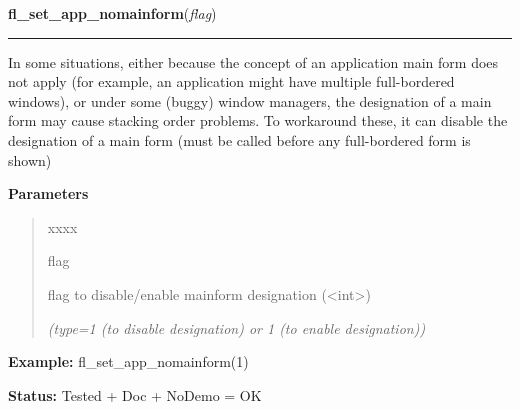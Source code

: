 \hspace{.8\funcindent}\begin{boxedminipage}{\funcwidth}

    \raggedright \textbf{fl\_set\_app\_nomainform}(\textit{flag})

    \vspace{-1.5ex}

    \rule{\textwidth}{0.5\fboxrule}
\setlength{\parskip}{2ex}
    In some situations, either because the concept of an application main 
    form does not apply (for example, an application might have multiple 
    full-bordered windows), or under some (buggy) window managers, the 
    designation of a main form may cause stacking order problems. To 
    workaround these, it can disable the designation of a main form (must 
    be called before any full-bordered form is shown)

\setlength{\parskip}{1ex}
      \textbf{Parameters}
      \vspace{-1ex}

      \begin{quote}
        \begin{Ventry}{xxxx}

          \item[flag]

          flag to disable/enable mainform designation 
          ({\textless}int{\textgreater})

            {\it (type=1 (to disable designation) or 1 (to enable designation))}

        \end{Ventry}

      \end{quote}

\textbf{Example:} fl\_set\_app\_nomainform(1)



\textbf{Status:} Tested + Doc + NoDemo = OK



    \end{boxedminipage}

    \label{xformslib:library:fl_set_form_callback}

    \vspace{0.5ex}

